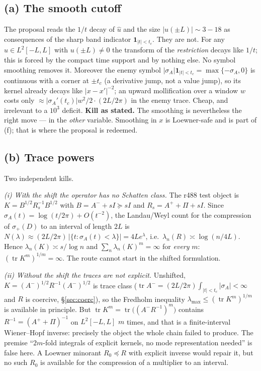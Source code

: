 \documentclass[11pt]{article}
\theoremstyle{remark}
\begin{document}
\subsection{(a) The smooth cutoff}\label{sec:a}

The proposal reads the $1/t$ decay of $\hat u$ and the size
$|u(\pm L)|\sim3\!-\!18$ as consequences of the sharp band
indicator $\mathbf 1_{|t|<t_c}$.  They are not.
For any $u\in L^2[-L,L]$ with $u(\pm L)\neq0$ the transform of
the \emph{restriction} decays like $1/t$; this is forced by the
compact time support and by nothing else.  No symbol smoothing
removes it.
Moreover the enemy symbol
$|\sigma_A|\mathbf 1_{|t|<t_c}=\max\{-\sigma_A,0\}$
is continuous with a corner at $\pm t_c$ (a derivative jump,
not a value jump), so its kernel already decays like
$|x-x'|^{-2}$; an upward mollification over a window $w$ costs
only $\approx|\sigma_A'(t_c)|w^2/2\cdot(2L/2\pi)$ in the enemy
trace.  Cheap, and irrelevant to a $10^3$ deficit.
\textbf{Kill as stated.}
The smoothing is nevertheless the right move --- in the
\emph{other} variable.  Smoothing in $x$ is Loewner-safe and is
part of (f); that is where the proposal is redeemed.

\subsection{(b) Trace powers}\label{sec:b}

Two independent kills.

\emph{(i) With the shift the operator has no Schatten class.}
The r488 test object is
$K=B^{1/2}R_s^{-1}B^{1/2}$ with $B=A^-+sI\succeq sI$ and
$R_s=A^++\Pi+sI$.
Since $\sigma_A(t)=\log(t/2\pi)+O(t^{-2})$, the Landau/Weyl
count for the compression of $\sigma_+(D)$ to an interval of
length $2L$ is
$N(\lambda)\approx(2L/2\pi)\,|\{t:\sigma_A(t)<\lambda\}|
=4Le^{\lambda}$, i.e.\ $\lambda_n(R)\asymp\log(n/4L)$.
Hence $\lambda_n(K)\asymp s/\log n$ and
$\sum_n\lambda_n(K)^m=\infty$ for \emph{every} $m$:
$(\operatorname{tr}K^m)^{1/m}=\infty$.
The route cannot start in the shifted formulation.

\emph{(ii) Without the shift the traces are not explicit.}
Unshifted, $K=(A^-)^{1/2}R^{-1}(A^-)^{1/2}$ is trace class
($\operatorname{tr}A^-=(2L/2\pi)\int_{|t|<t_c}|\sigma_A|<\infty$
and $R$ is coercive, \S\ref{sec:coerc}), so the Fredholm
inequality $\lambda_{\max}\le(\operatorname{tr}K^m)^{1/m}$ is
available in principle.  But
$\operatorname{tr}K^m=\operatorname{tr}\big((A^-R^{-1})^m\big)$
contains $R^{-1}=(A^++\Pi)^{-1}$ on $L^2[-L,L]$ $m$ times, and
that is a finite-interval Wiener--Hopf inverse: precisely the
object the whole chain failed to produce.  The premise
``$2m$-fold integrals of explicit kernels, no mode
representation needed'' is false here.
A Loewner minorant $R_0\preceq R$ with explicit inverse would
repair it, but no such $R_0$ is available for the compression
of a multiplier to an interval.
\end{document}
